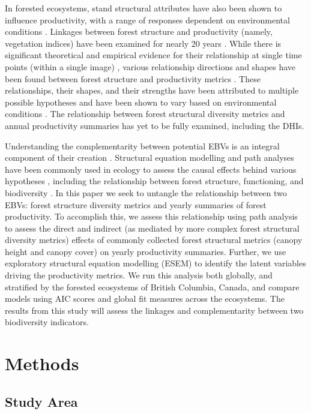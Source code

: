 \documentclass[
  authoryear,
  review,
  3p,
  twocolumn]{elsarticle}
\begin{document}
In forested ecosystems, stand structural attributes have also been shown
to influence productivity, with a range of responses dependent on
environmental conditions \citep{ali2019}. Linkages between forest
structure and productivity (namely, vegetation indices) have been
examined for nearly 20 years
\citetext{\citealp[\citet{knyazikhin1998}]{huete2002}; \citealp{myneni1994}}.
While there is significant theoretical and empirical evidence for their
relationship at single time points (within a single image)
\citep{myneni1994}, various relationship directions and shapes have been
found between forest structure and productivity metrics \citep{ali2019}.
These relationships, their shapes, and their strengths have been
attributed to multiple possible hypotheses and have been shown to vary
based on environmental conditions \citep{ali2019}. The relationship
between forest structural diversity metrics and annual productivity
summaries has yet to be fully examined, including the DHIs.

Understanding the complementarity between potential EBVs is an integral
component of their creation \citep{skidmore2021}. Structural equation
modelling and path analyses have been commonly used in ecology to assess
the causal effects behind various hypotheses \citep{fan2016, grace2010},
including the relationship between forest structure, functioning, and
biodiversity \citep{ali2019}. In this paper we seek to untangle the
relationship between two EBVs: forest structure diversity metrics and
yearly summaries of forest productivity. To accomplish this, we assess
this relationship using path analysis to assess the direct and indirect
(as mediated by more complex forest structural diversity metrics)
effects of commonly collected forest structural metrics (canopy height
and canopy cover) on yearly productivity summaries. Further, we use
exploratory structural equation modelling (ESEM) to identify the latent
variables driving the productivity metrics. We run this analysis both
globally, and stratified by the forested ecosystems of British Columbia,
Canada, and compare models using AIC scores and global fit measures
across the ecosystems. The results from this study will assess the
linkages and complementarity between two biodiversity indicators.

\hypertarget{methods}{%
\section{Methods}\label{methods}}

\hypertarget{study-area}{%
\subsection{Study Area}\label{study-area}}
\end{document}
